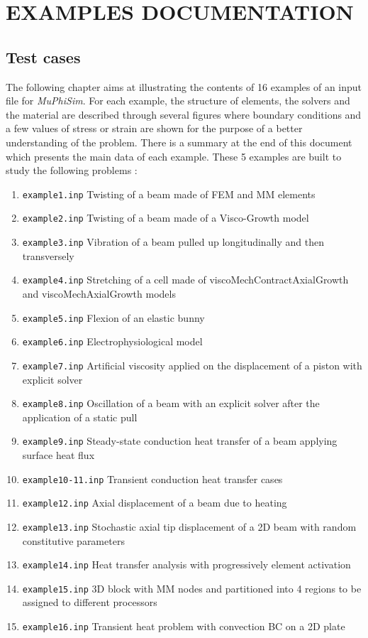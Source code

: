 \documentclass[oneside,11pt,times]{book}
\begin{document}
\chapter{EXAMPLES DOCUMENTATION} \label{Chapter:examples}

\section{Test cases}

The following chapter aims at illustrating the contents of 16 examples of an input file for \textit{MuPhiSim}. For each example, the structure of elements, the solvers and the material are described through several figures where boundary conditions and a few values of stress or strain are shown for the purpose of a better understanding of the problem. There is a summary at the end of this document which presents the main data of each example. These 5 examples are built to study the following problems :

\begin{enumerate}
\item \texttt{example1.inp} Twisting of a beam made of FEM and MM elements
\item \texttt{example2.inp} Twisting of a beam made of a Visco-Growth model
\item \texttt{example3.inp} Vibration of a beam pulled up longitudinally and then transversely
\item \texttt{example4.inp} Stretching of a cell made of viscoMechContractAxialGrowth and viscoMechAxialGrowth models
\item \texttt{example5.inp} Flexion of an elastic bunny
\item \texttt{example6.inp} Electrophysiological model
\item \texttt{example7.inp} Artificial viscosity applied on the displacement of a piston with explicit solver
\item \texttt{example8.inp} Oscillation of a beam with an explicit solver after the application of a static pull
\item \texttt{example9.inp} Steady-state conduction heat transfer of a beam applying surface heat flux
\item \texttt{example10-11.inp} Transient conduction heat transfer cases
\item \texttt{example12.inp} Axial displacement of a beam due to heating
\item \texttt{example13.inp} Stochastic axial tip displacement of a 2D beam with random constitutive parameters
\item \texttt{example14.inp} Heat transfer analysis with progressively element activation
\item \texttt{example15.inp} 3D block with MM nodes and  partitioned into 4 regions to be assigned to different processors
\item \texttt{example16.inp} Transient heat problem with convection BC on a 2D plate
\end{enumerate}
\end{document}
